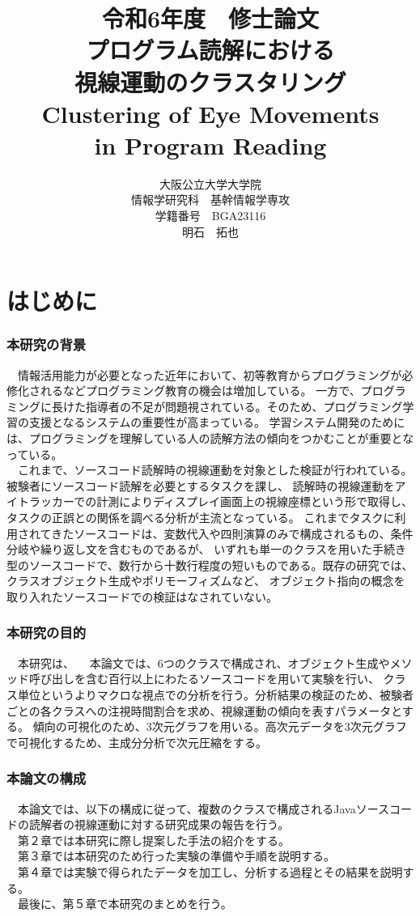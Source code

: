 \documentclass[paper=a4paper,fontsize=10pt]{jlreq}
\title{\huge 令和6年度　修士論文\\\vspace{100truept}プログラム読解における\\視線運動のクラスタリング\\
Clustering of Eye Movements\\ in Program Reading}
\author{\large 大阪公立大学大学院　\\情報学研究科　基幹情報学専攻\\学籍番号　BGA23116\\明石　拓也}
\begin{document}
\maketitle
\clearpage

\tableofcontents
\clearpage

\part{はじめに}
  \section{本研究の背景}
  　情報活用能力が必要となった近年において、初等教育からプログラミングが必修化されるなどプログラミング教育の機会は増加している。
  一方で、プログラミングに長けた指導者の不足が問題視されている。そのため、プログラミング学習の支援となるシステムの重要性が高まっている。
  学習システム開発のためには、プログラミングを理解している人の読解方法の傾向をつかむことが重要となっている。\\
  　これまで、ソースコード読解時の視線運動を対象とした検証が行われている。被験者にソースコード読解を必要とするタスクを課し、
  読解時の視線運動をアイトラッカーでの計測によりディスプレイ画面上の視線座標という形で取得し、タスクの正誤との関係を調べる分析が主流となっている。
  これまでタスクに利用されてきたソースコードは、変数代入や四則演算のみで構成されるもの、条件分岐や繰り返し文を含むものであるが、
  いずれも単一のクラスを用いた手続き型のソースコードで、数行から十数行程度の短いものである。既存の研究では、クラスオブジェクト生成やポリモーフィズムなど、
  オブジェクト指向の概念を取り入れたソースコードでの検証はなされていない。
  

  \section{本研究の目的}
  　本研究は、
  　本論文では、6つのクラスで構成され、オブジェクト生成やメソッド呼び出しを含む百行以上にわたるソースコードを用いて実験を行い、
  クラス単位というよりマクロな視点での分析を行う。分析結果の検証のため、被験者ごとの各クラスへの注視時間割合を求め、視線運動の傾向を表すパラメータとする。
  傾向の可視化のため、3次元グラフを用いる。高次元データを3次元グラフで可視化するため、主成分分析で次元圧縮をする。

  \section{本論文の構成}
  　本論文では、以下の構成に従って、複数のクラスで構成されるJavaソースコードの読解者の視線運動に対する研究成果の報告を行う。\\
  　第２章では本研究に際し提案した手法の紹介をする。\\
  　第３章では本研究のため行った実験の準備や手順を説明する。\\
  　第４章では実験で得られたデータを加工し、分析する過程とその結果を説明する。\\
  　最後に、第５章で本研究のまとめを行う。
\end{document}
